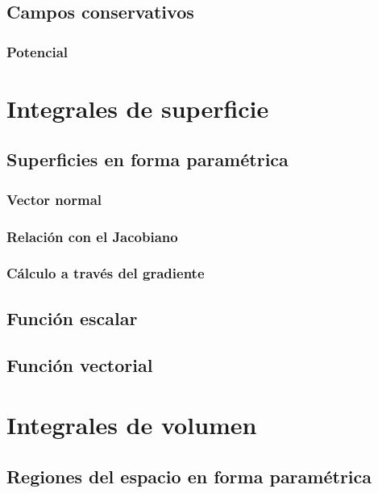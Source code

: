 \documentclass[12pt, fleqn]{report}                             %
\theoremstyle{break}                                            %
\begin{document}
            \subsection{Campos conservativos}
            
                \subsubsection{Potencial}
        
        \section{Integrales de superficie}
        
            \subsection{Superficies en forma paramétrica}
            
                \subsubsection{Vector normal}
            
                \subsubsection{Relación con el Jacobiano}
                
                \subsubsection{Cálculo a través del gradiente}
            
            \subsection{Función escalar}
            
            \subsection{Función vectorial}
        
        \section{Integrales de volumen}
        
            \subsection{Regiones del espacio en forma paramétrica}
            
\end{document}
